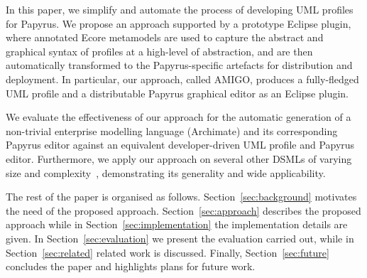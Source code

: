 In this paper, we simplify and automate the process of developing UML profiles for Papyrus. We propose an approach supported by a prototype Eclipse plugin, where annotated Ecore metamodels are used to capture the abstract and graphical syntax of profiles at a high-level of abstraction, and are then automatically transformed to the Papyrus-specific artefacts for distribution and deployment. 
In particular, our approach, called AMIGO, produces a fully-fledged UML profile and a distributable Papyrus graphical editor as an Eclipse plugin. 

We evaluate the effectiveness of our approach for the automatic generation of a non-trivial enterprise modelling language (Archimate) and its corresponding Papyrus editor against an equivalent developer-driven UML profile and Papyrus editor. 
Furthermore, we apply our approach on several other DSMLs of varying size and complexity~\cite{williams2013metamodels}, demonstrating its generality and wide applicability.

The rest of the paper is organised as follows. 
Section~\ref{sec:background} motivates the need of the proposed approach. 
Section~\ref{sec:approach} describes the proposed approach while in Section~\ref{sec:implementation} the implementation details are given. 
In Section~\ref{sec:evaluation} we present the evaluation carried out, while in Section~\ref{sec:related} related work is discussed. 
Finally, Section~\ref{sec:future} concludes the paper and highlights plans for future work.
